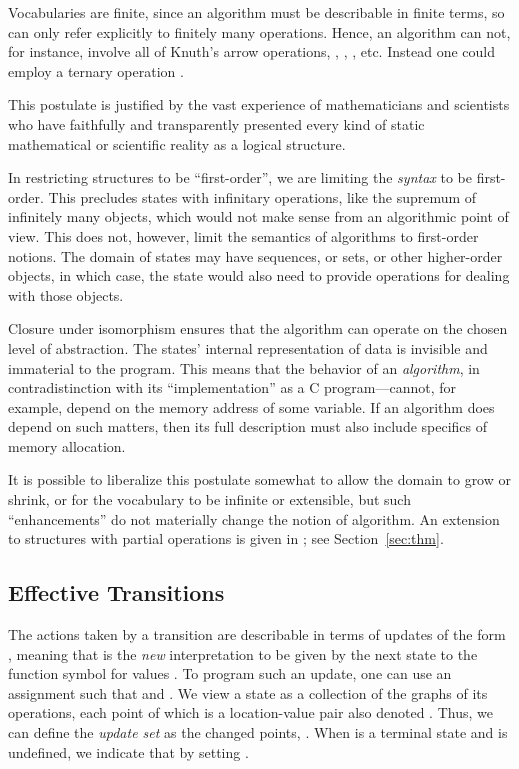 \documentclass[copyright,creativecommons,english]{eptcs}
\begin{document}
Vocabularies are finite, since an algorithm must be describable in finite terms,
so can only refer explicitly to finitely many operations.
Hence, an algorithm can not, for instance, involve all of Knuth's arrow operations,
, 
, 
, 
etc.
Instead one could employ a ternary operation .

This postulate is justified by the vast experience of mathematicians and scientists who have faithfully and transparently
presented every kind of static mathematical or scientific reality as a logical structure.

In restricting structures to be ``first-order'', we are limiting the \emph{syntax} to be first-order.
This precludes states with infinitary operations, like the supremum of infinitely many objects, which would not make sense from an algorithmic point of view.  This does not, however, limit the semantics of algorithms to first-order notions.  The domain of states may have sequences, or sets, or other higher-order objects, in which case, the state would also need to provide operations for dealing with those objects.

Closure under isomorphism ensures that the algorithm can
operate on the chosen level of abstraction.
The states' internal representation of data is invisible and immaterial to the program.
This means that the behavior of an \textit{algorithm}, in contradistinction with its ``implementation'' as a C program---cannot,
for example, depend on the memory address of some variable. 
If an algorithm does depend on such matters, then its full description must also include specifics of memory allocation.

It is possible to liberalize this postulate somewhat to allow the domain to grow or shrink, or for the vocabulary to be infinite
or extensible,
but such ``enhancements'' do not materially change the notion of algorithm.
An extension to structures with partial operations is given in \cite{Exact}; see Section~\ref{sec:thm}.

\subsection{Effective Transitions}

The actions taken by a transition are describable in terms of updates
of the form , meaning that  is the \emph{new} interpretation to be given by the next state
to the function symbol  for values .
To program such an update, one can use an assignment  such that  and .
We view a state   as a collection of the graphs of its operations,
each point of which is a location-value pair also denoted .
Thus, we can define the \emph{update set}  as the changed points, .
When  is a terminal state and  is undefined, we indicate that by setting
.
\end{document}
